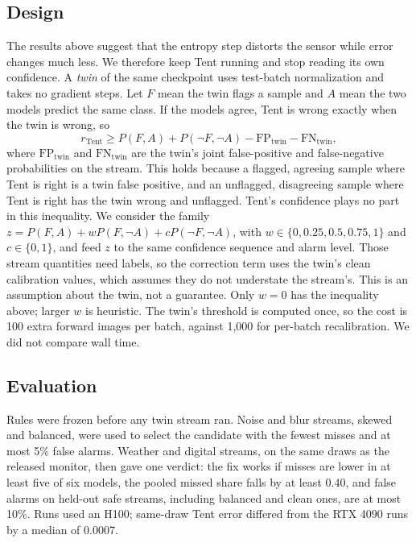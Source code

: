 \documentclass[runningheads]{llncs}
\begin{document}
\subsection{Design}
The results above suggest that the entropy step distorts the sensor while error changes much less. We therefore keep Tent running and stop reading its own confidence. A \emph{twin} of the same checkpoint uses test-batch normalization and takes no gradient steps. Let $F$ mean the twin flags a sample and $A$ mean the two models predict the same class. If the models agree, Tent is wrong exactly when the twin is wrong, so
\begin{equation}
r_{\mathrm{Tent}} \ge P(F,A) + P(\neg F,\neg A) - \mathrm{FP}_{\mathrm{twin}} - \mathrm{FN}_{\mathrm{twin}},
\end{equation}
where $\mathrm{FP}_{\mathrm{twin}}$ and $\mathrm{FN}_{\mathrm{twin}}$ are the twin's joint false-positive and false-negative probabilities on the stream. This holds because a flagged, agreeing sample where Tent is right is a twin false positive, and an unflagged, disagreeing sample where Tent is right has the twin wrong and unflagged. Tent's confidence plays no part in this inequality. We consider the family $z=P(F,A)+wP(F,\neg A)+cP(\neg F,\neg A)$, with $w\in\{0,0.25,0.5,0.75,1\}$ and $c\in\{0,1\}$, and feed $z$ to the same confidence sequence and alarm level. Those stream quantities need labels, so the correction term uses the twin's clean calibration values, which assumes they do not understate the stream's. This is an assumption about the twin, not a guarantee. Only $w=0$ has the inequality above; larger $w$ is heuristic. The twin's threshold is computed once, so the cost is 100 extra forward images per batch, against 1,000 for per-batch recalibration. We did not compare wall time.

\subsection{Evaluation}
Rules were frozen before any twin stream ran. Noise and blur streams, skewed and balanced, were used to select the candidate with the fewest misses and at most 5\% false alarms. Weather and digital streams, on the same draws as the released monitor, then gave one verdict: the fix works if misses are lower in at least five of six models, the pooled missed share falls by at least 0.40, and false alarms on held-out safe streams, including balanced and clean ones, are at most 10\%. Runs used an H100; same-draw Tent error differed from the RTX 4090 runs by a median of 0.0007.
\end{document}
